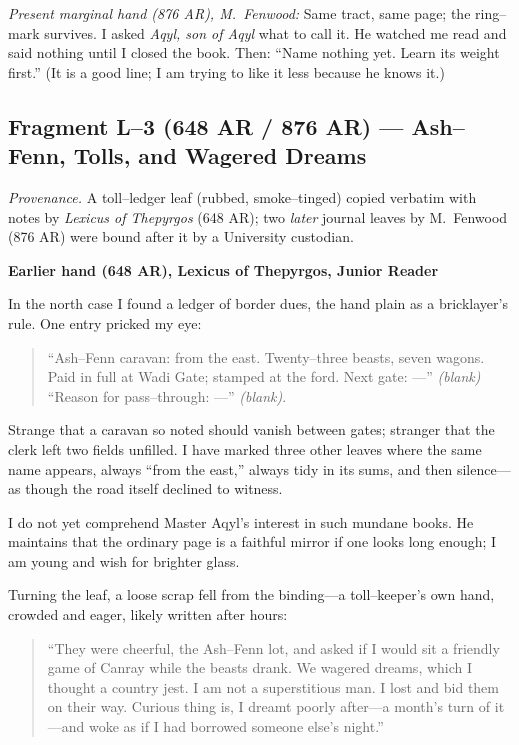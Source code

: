 \documentclass[11pt]{article}
\numberwithin{equation}{section} %
\theoremstyle{plain} %
\theoremstyle{definition} %
\theoremstyle{remark} %
\begin{document}
\medskip
\noindent\textit{Present marginal hand (876 AR), M.\ Fenwood:} Same tract, same page; the ring–mark survives. I asked \textit{Aqyl, son of Aqyl} what to call it. He watched me read and said nothing until I closed the book. Then: “Name nothing yet. Learn its weight first.” (It is a good line; I am trying to like it less because he knows it.)

\subsection{Fragment L--3 (648 AR / 876 AR) — Ash–Fenn, Tolls, and Wagered Dreams}
\label{frag:l3}

\noindent\textit{Provenance.} A toll–ledger leaf (rubbed, smoke–tinged) copied verbatim with notes by \textit{Lexicus of Thepyrgos} (648 AR); two \textit{later} journal leaves by M.\ Fenwood (876 AR) were bound after it by a University custodian.

\medskip
\noindent\textbf{Earlier hand (648 AR), Lexicus of Thepyrgos, Junior Reader}

In the north case I found a ledger of border dues, the hand plain as a bricklayer’s rule. One entry pricked my eye:

\begin{quote}\small
“Ash–Fenn caravan: from the east. Twenty–three beasts, seven wagons. Paid in full at Wadi Gate; stamped at the ford. Next gate: —” \textit{(blank)} “Reason for pass–through: —” \textit{(blank)}.
\end{quote}

Strange that a caravan so noted should vanish between gates; stranger that the clerk left two fields unfilled. I have marked three other leaves where the same name appears, always “from the east,” always tidy in its sums, and then silence—as though the road itself declined to witness.

I do not yet comprehend Master Aqyl’s interest in such mundane books. He maintains that the ordinary page is a faithful mirror if one looks long enough; I am young and wish for brighter glass.

Turning the leaf, a loose scrap fell from the binding—a toll–keeper’s own hand, crowded and eager, likely written after hours:

\begin{quote}\small
“They were cheerful, the Ash–Fenn lot, and asked if I would sit a friendly game of Canray while the beasts drank. We wagered dreams, which I thought a country jest. I am not a superstitious man. I lost and bid them on their way. Curious thing is, I dreamt poorly after—a month’s turn of it—and woke as if I had borrowed someone else’s night.”
\end{quote}
\end{document}
